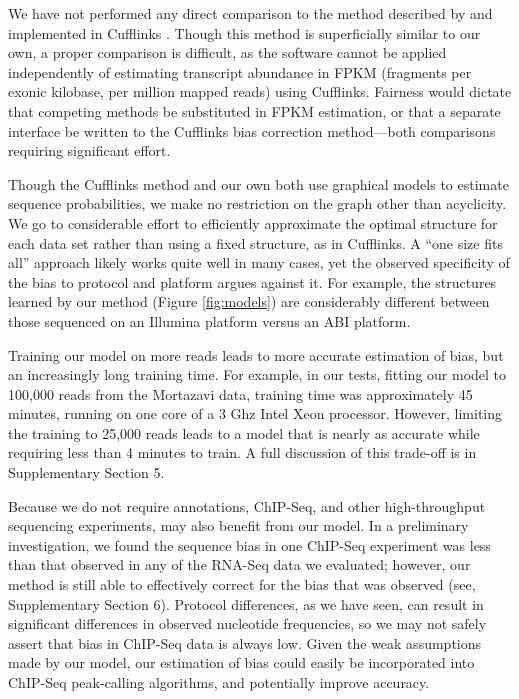 \documentclass{bioinfo}
\begin{document}
We have not performed any direct comparison to the method described by
\citet{Roberts2011} and implemented in Cufflinks \citep{Trapnell2010}. Though
this method is superficially similar to our own, a proper comparison is
difficult, as the software cannot be applied independently of estimating
transcript abundance in FPKM (fragments per exonic kilobase, per million mapped
reads) using Cufflinks. Fairness would dictate that competing methods be
substituted in FPKM estimation, or that a separate interface be written to the
Cufflinks bias correction method---both comparisons requiring significant effort.

Though the Cufflinks method and our own both use graphical models to estimate
sequence probabilities, we make no restriction on the graph other than
acyclicity. We go to considerable effort to efficiently approximate the optimal
structure for each data set rather than using a fixed structure, as in
Cufflinks. A ``one size fits all'' approach likely works quite well in many
cases, yet the observed specificity of the bias to protocol and platform argues
against it. For example, the structures learned by our method (Figure
\ref{fig:models}) are considerably different between those sequenced on an
Illumina platform versus an ABI platform.

Training our model on more reads leads to more accurate estimation of bias, but
an increasingly long training time. For example, in our tests, fitting our model to
100,000 reads from the Mortazavi data, training time was approximately 45
minutes, running on one core of a 3 Ghz Intel Xeon processor. However, limiting
the training to 25,000 reads leads to a model that is nearly as accurate while
requiring less than 4 minutes to train. A full discussion of this trade-off is in
Supplementary Section 5.

Because we do not require annotations, ChIP-Seq, and other high-throughput
sequencing experiments, may also benefit from our model. In a preliminary
investigation, we found the sequence bias in one ChIP-Seq experiment
\cite{Cao2010} was less than that observed in any of the RNA-Seq data we
evaluated; however, our method is still able to effectively correct for the bias
that was observed (see, Supplementary Section 6).  Protocol differences, as we
have seen, can result in significant differences in observed nucleotide
frequencies, so we may not safely assert that bias in ChIP-Seq data is always
low.  Given the weak assumptions made by our model, our estimation of bias could
easily be incorporated into ChIP-Seq peak-calling algorithms, and potentially
improve accuracy.
\end{document}
